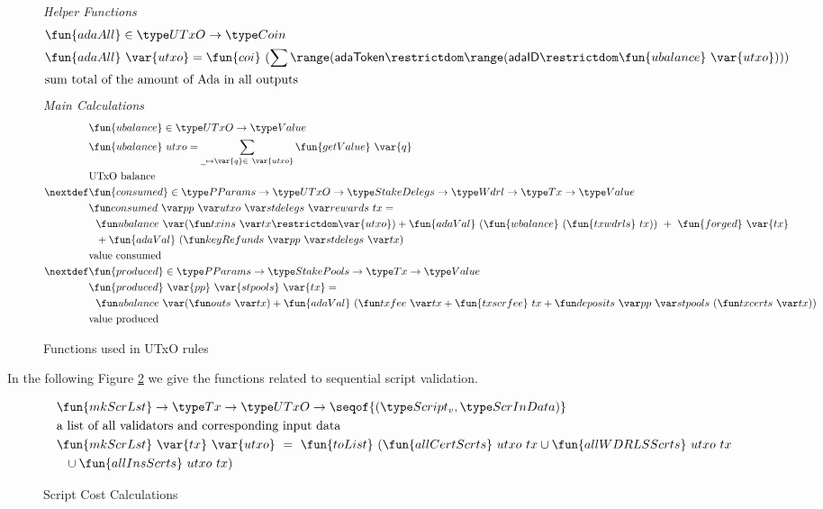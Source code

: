 \begin{figure}[htb]
  \emph{Helper Functions}
  \begin{align*}
    & \fun{adaAll} \in \UTxO \to \Coin \\
    & \fun{adaAll}~{\var{utxo}} = \fun{coi}~
          (\sum  \range ({\mathsf{adaToken}} \restrictdom \range ({\mathsf{adaID}} \restrictdom
          \fun{ubalance}~\var{utxo}))) \\
    & \text{sum total of the amount of Ada in all outputs} \\
  \end{align*}
  \emph{Main Calculations}
  \begin{align*}
    & \fun{ubalance} \in \UTxO \to \Value \\
    & \fun{ubalance} ~ utxo = \sum_{\wcard\mapsto\var{q}\in~\var{utxo}}
    \fun{getValue}~\var{q} \\
    & \text{UTxO balance} \\
    \nextdef
    & \fun{consumed} \in \PParams \to \UTxO \to \StakeDelegs \to \Wdrl \to \Tx \to \Value \\
    & \consumed{pp}{utxo}{stdelegs}{rewards}~{tx} = \\
    & ~~\ubalance{(\txins{tx} \restrictdom \var{utxo})} +
        \fun{adaVal}~(\fun{wbalance}~(\fun{txwdrls}~{tx}))~+~\fun{forged}~\var{tx} \\
    & ~~ + \fun{adaVal}~(\keyRefunds{pp}{stdelegs}{tx}) \\
    & \text{value consumed} \\
    \nextdef
    & \fun{produced} \in \PParams \to \StakePools \to \Tx \to \Value \\
    & \fun{produced}~\var{pp}~\var{stpools}~\var{tx} = \\
    &~~\ubalance{(\outs{tx})}
    + \fun{adaVal}~(\txfee{tx} + \fun{txscrfee}~{tx} + \deposits{pp}{stpools}~{(\txcerts{tx})})\\
    & \text{value produced} \\
  \end{align*}
  \caption{Functions used in UTxO rules}
  \label{fig:functions:utxo}
\end{figure}

\clearpage

In the following Figure \ref{fig:functions:script1} we give the functions
related to sequential script validation.

\begin{figure}[htb]
  \begin{align*}
    & \fun{mkScrLst} \to \Tx \to \UTxO \to \seqof{(\ScriptV,\ScrInData)} \\
    & \text{a list of all validators and corresponding input data} \\
    & \fun{mkScrLst} ~\var{tx}~ \var{utxo} ~=~
    \fun{toList}~(\fun{allCertScrts}~{utxo}~{tx} \cup \fun{allWDRLSScrts}~{utxo}~{tx} \\
    & ~~ \cup \fun{allInsScrts}~{utxo}~{tx}) \\
  \end{align*}
  \caption{Script Cost Calculations}
  \label{fig:functions:script1}
\end{figure}

